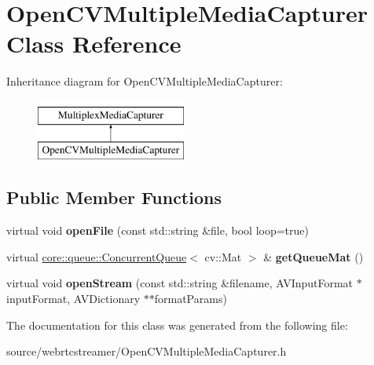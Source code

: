 \hypertarget{class_open_c_v_multiple_media_capturer}{}\section{Open\+C\+V\+Multiple\+Media\+Capturer Class Reference}
\label{class_open_c_v_multiple_media_capturer}
Inheritance diagram for Open\+C\+V\+Multiple\+Media\+Capturer\+:\begin{figure}[H]
\begin{center}
\leavevmode
\includegraphics[height=2.000000cm]{d3/da7/class_open_c_v_multiple_media_capturer}
\end{center}
\end{figure}
\subsection*{Public Member Functions}
\begin{DoxyCompactItemize}
\item 
\mbox{\label{class_open_c_v_multiple_media_capturer_a368bd2ddab7b4b97b82342295e0f5d5b}} 
virtual void {\bfseries open\+File} (const std\+::string \&file, bool loop=true)
\item 
\mbox{\label{class_open_c_v_multiple_media_capturer_af846f4349d418de734da38b2ba81abb1}} 
virtual \hyperlink{classcore_1_1queue_1_1_concurrent_queue}{core\+::queue\+::\+Concurrent\+Queue}$<$ cv\+::\+Mat $>$ \& {\bfseries get\+Queue\+Mat} ()
\item 
\mbox{\label{class_open_c_v_multiple_media_capturer_ad09566b5baab4e48b74a9ed86685b01b}} 
virtual void {\bfseries open\+Stream} (const std\+::string \&filename, A\+V\+Input\+Format $\ast$input\+Format, A\+V\+Dictionary $\ast$$\ast$format\+Params)
\end{DoxyCompactItemize}


The documentation for this class was generated from the following file\+:\begin{DoxyCompactItemize}
\item 
source/webrtcstreamer/Open\+C\+V\+Multiple\+Media\+Capturer.\+h\end{DoxyCompactItemize}
